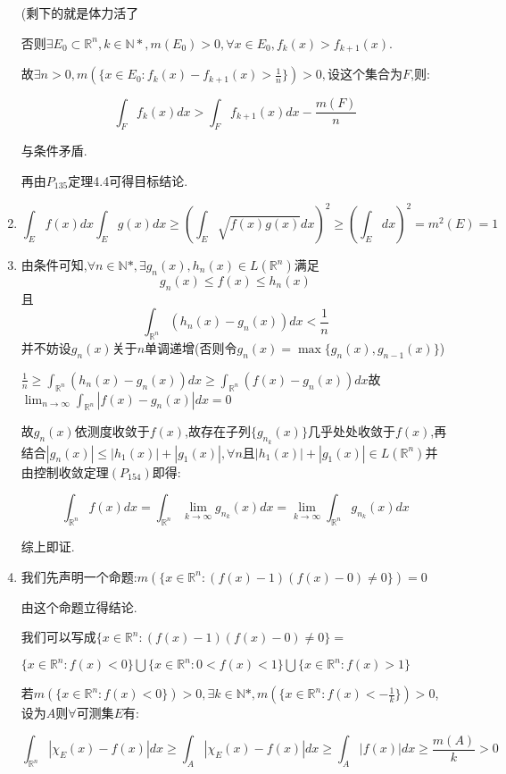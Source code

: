 \documentclass[UTF8, a4paper, 12pt, oneside, onecolumn]{article}
\numberwithin{equation}{section}
\numberwithin{figure}{section}
\numberwithin{table}{section}
\theoremstyle{nonumberplain}	%
\theoremstyle{plain}	%
\theoremstyle{plain}	%
\theoremstyle{plain}	%
\theoremstyle{plain}	%
\theoremstyle{nonumberplain}
\begin{document}
\begin{enumerate}
	(剩下的就是体力活了
	
	否则$\exists E_0\subset\mathbb{R}^n,k\in \mathbb{N*},m(E_0)>0,\forall x\in E_0,f_k(x)>f_{k+1}(x)$.
	
	故$\displaystyle\exists n>0,m(\{x\in E_0:f_k(x)-f_{k+1}(x)>\frac{1}{n}\})>0,$设这个集合为$F$,则:
	
	$$\int_{F}f_k(x)dx>\int_{F}f_{k+1}(x)dx -\frac{m(F)}{n}$$
	
	与条件矛盾.
	
	再由$P_{135}$定理4.4可得目标结论.
	\item $$\int_{E}f(x)dx\int_{E}g(x)dx\geqslant\left(\int_{E}\sqrt{f(x)g(x)}dx\right)^2\geqslant \left(\int_{E}dx\right)^2=m^2(E)=1$$
	\item 由条件可知,$\displaystyle\forall n\in \mathbb{N}*,\exists g_n(x),h_n(x)\in L(\mathbb{R}^n)$满足
	$$g_n(x)\leqslant f(x)\leqslant h_n(x)$$
	且
	$$\displaystyle\int_{\mathbb{R}^n}(h_n(x)-g_n(x))dx<\frac{1}{n}$$
	并不妨设$g_n(x)$关于$n$单调递增(否则令$g_n(x)=\max\{g_n(x),g_{n-1}(x)\}$)
	
	$\displaystyle\frac{1}{n}\geqslant\int_{\mathbb{R}^n}(h_n(x)-g_n(x))dx\geqslant\int_{\mathbb{R}^n}(f(x)-g_n(x))dx$故$\displaystyle\lim_{n\rightarrow \infty}\int_{\mathbb{R}^n}|f(x)-g_n(x)|dx=0$
	
	故$g_n(x)$依测度收敛于$f(x)$,故存在子列$\{g_{n_k}(x)\} $几乎处处收敛于$f(x)$,再结合$\displaystyle |g_n(x)|\leqslant |h_1(x)|+|g_1(x)|,\forall n$且$|h_1(x)|+|g_1(x)|\in L(\mathbb{R}^n)$并由控制收敛定理$(P_{154})$即得:
	
	$$\int_{\mathbb{R}^n}f(x)dx=\int_{\mathbb{R}^n}\lim_{k\rightarrow \infty}g_{n_k}(x)dx=\lim_{k\rightarrow \infty}\int_{\mathbb{R}^n}g_{n_k}(x)dx$$
	
	综上即证.
	\item 我们先声明一个命题:$m(\{x\in \mathbb{R}^n:(f(x)-1)(f(x)-0)\neq 0\})=0$
	
	由这个命题立得结论.
	
	我们可以写成$\{x\in \mathbb{R}^n:(f(x)-1)(f(x)-0)\neq 0\}=$
	
	$\{x\in \mathbb{R}^n:f(x)<0\}\bigcup\{x\in \mathbb{R}^n:0<f(x)<1\}\bigcup\{x\in \mathbb{R}^n:f(x)>1\}$
	
	若$\displaystyle m(\{x\in \mathbb{R}^n:f(x)<0\})>0,\exists k\in\mathbb{N}*,m(\{x\in \mathbb{R}^n:f(x)<-\frac{1}{k}\})>0$,设为$A$则$\forall$可测集$E$有:
	
	$$\int_{\mathbb{R}^n}|\chi_E(x)-f(x)|dx\geqslant \int_{A}|\chi_E(x)-f(x)|dx\geqslant\int_{A}|f(x)|dx\geqslant\frac{m(A)}{k}>0$$
	

\end{enumerate}
\end{document}
